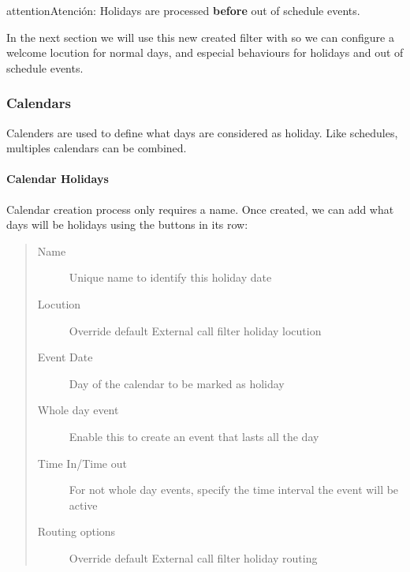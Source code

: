\documentclass[letterpaper,10pt,spanish]{sphinxmanual}
\begin{document}
\begin{notice}{attention}{Atención:}
Holidays are processed \textbf{before} out of schedule events.
\end{notice}

In the next section we will use this new created filter with
{\hyperref[administration_portal/brand/views/ddis:ddis]{}} so we can configure a welcome locution for normal days,
and especial behaviours for holidays and out of schedule events.


\subsubsection{Calendars}
\label{administration_portal/client/vpbx/routing_tools/calendars:calendars}\label{administration_portal/client/vpbx/routing_tools/calendars::doc}\label{administration_portal/client/vpbx/routing_tools/calendars:id1}
Calenders are used to define what days are considered as holiday. Like
schedules, multiples calendars can be combined.


\paragraph{Calendar Holidays}
\label{administration_portal/client/vpbx/routing_tools/calendars:calendar-holidays}
Calendar creation process only requires a name. Once created, we can add what
days will be holidays using the buttons in its row:
\begin{quote}
\begin{description}
\item[{Name}] \leavevmode
Unique name to identify this holiday date

\item[{Locution}] \leavevmode
Override default External call filter holiday locution

\item[{Event Date}] \leavevmode
Day of the calendar to be marked as holiday

\item[{Whole day event}] \leavevmode
Enable this to create an event that lasts all the day

\item[{Time In/Time out}] \leavevmode
For not whole day events, specify the time interval the event will be active

\item[{Routing options}] \leavevmode
Override default External call filter holiday routing

\end{description}
\end{quote}
\end{document}
